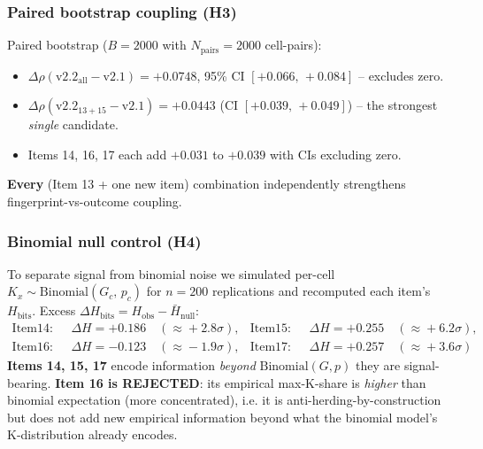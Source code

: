 \subsubsection{Paired bootstrap coupling (H3)}
Paired bootstrap ($B=2000$ with $N_{\mathrm{pairs}}=2000$ cell-pairs):
\begin{itemize}
  \item $\Delta\rho(\mathrm{v2.2}_{\mathrm{all}} - \mathrm{v2.1}) = \mathbf{+0.0748}$, 95\% CI $[\mathbf{+0.066,\,+0.084}]$ -- excludes zero.
  \item $\Delta\rho(\mathrm{v2.2}_{13+15} - \mathrm{v2.1}) = +0.0443$ (CI $[+0.039,\,+0.049]$) -- the strongest \emph{single} candidate.
  \item Items 14, 16, 17 each add $+0.031$ to $+0.039$ with CIs excluding zero.
\end{itemize}
\textbf{Every} (Item 13 + one new item) combination independently strengthens
fingerprint-vs-outcome coupling.

\subsubsection{Binomial null control (H4)}
To separate signal from binomial noise we simulated per-cell
$K_x \sim \mathrm{Binomial}(G_c,\, p_c)$ for $n=200$ replications and
recomputed each item's $H_{\mathrm{bits}}$. Excess
$\Delta H_{\mathrm{bits}} = H_{\mathrm{obs}} - \bar H_{\mathrm{null}}$:
\begin{align}
  \mathrm{Item14:}\;&\ \Delta H = +0.186\quad(\!\approx\!+2.8\sigma), &
  \mathrm{Item15:}\;&\ \Delta H = +0.255\quad(\!\approx\!+6.2\sigma), \\
  \mathrm{Item16:}\;&\ \Delta H = -0.123\quad(\!\approx\!-1.9\sigma), &
  \mathrm{Item17:}\;&\ \Delta H = +0.257\quad(\!\approx\!+3.6\sigma)
  \label{eq:null-excess}
\end{align}
\textbf{Items 14, 15, 17} encode information \emph{beyond} $\mathrm{Binomial}(G,p)$
they are signal-bearing. \textbf{Item 16 is REJECTED}: its empirical
max-K-share is \emph{higher} than binomial expectation (more concentrated),
i.e. it is anti-herding-by-construction but does not add new empirical
information beyond what the binomial model's K-distribution already encodes.

